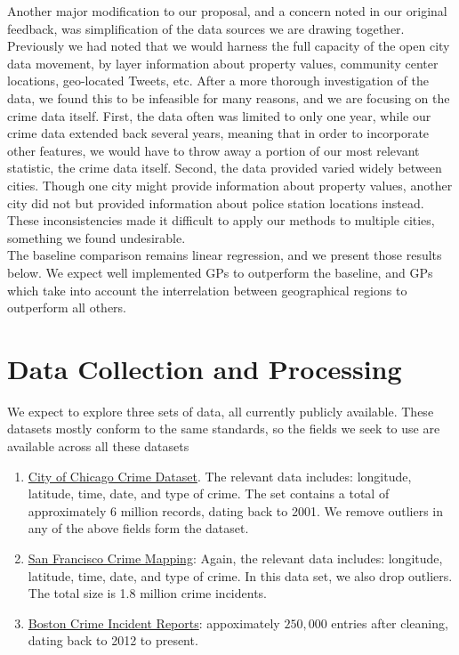 \documentclass[11pt]{article}
\begin{document}
Another major modification to our proposal, and a concern noted in our original feedback, was simplification of the data sources we are drawing together. Previously we had noted that we would harness the full capacity of the open city data movement, by layer information about property values, community center locations, geo-located Tweets, etc. After a more thorough investigation of the data, we found this to be infeasible for many reasons, and we are focusing on the crime data itself. First, the data often was limited to only one year, while our crime data extended back several years, meaning that in order to incorporate other features, we would have to throw away a portion of our most relevant statistic, the crime data itself. Second, the data provided varied widely between cities. Though one city might provide information about property values, another city did not but provided information about police station locations instead. These inconsistencies made it difficult to apply our methods to multiple cities, something we found undesirable.\\

The baseline comparison remains linear regression, and we present those results below. We expect well implemented GPs to outperform the baseline, and GPs which take into account the interrelation between geographical regions to outperform all others.

\section{Data Collection and Processing}
We expect to explore three sets of data, all currently publicly available. These datasets mostly conform to the same standards, so the fields we seek to use are available across all these datasets
\begin{enumerate}
\item \href{https://data.cityofchicago.org/Public-Safety/Crimes-2001-to-present/ijzp-q8t2?q=crime}{City of Chicago Crime Dataset}. The relevant data includes: longitude, latitude, time, date, and type of crime. The set contains a total of approximately 6 million records, dating back to 2001. We remove outliers in any of the above fields form the dataset.
\item \href{https://data.sfgov.org/Public-Safety/Map-Crime-Incidents-from-1-Jan-2003/gxxq-x39z}{San Francisco Crime Mapping}: Again, the relevant data includes: longitude, latitude, time, date, and type of crime. In this data set, we also drop outliers. The total size is 1.8 million crime incidents. 
\item \href{https://data.cityofboston.gov/Public-Safety/Crime-Incident-Reports/7cdf-6fgx}{Boston Crime Incident Reports}: appoximately $250,000$ entries after cleaning, dating back to 2012 to present.
\end{enumerate}
\end{document}
